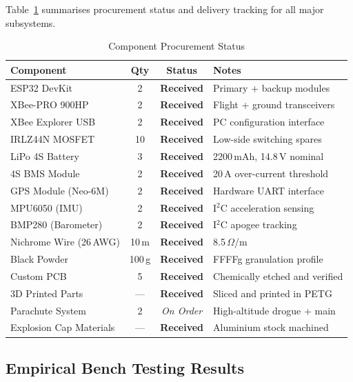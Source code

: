 Table~\ref{tab:procurement} summarises procurement status and delivery tracking
for all major subsystems.

\begin{table}[!htbp]
  \centering
  \caption{Component Procurement Status}
  \label{tab:procurement}
  \small
  \renewcommand{\arraystretch}{1.15}
  \begin{tabular}{@{}l|c|c|l@{}}
    \toprule
    \rowcolor{gray!22}\textbf{Component} & \textbf{Qty} & \textbf{Status} & \textbf{Notes} \\ \midrule
    ESP32 DevKit & 2 & \textbf{Received} & Primary + backup modules \\
    XBee-PRO 900HP & 2 & \textbf{Received} & Flight + ground transceivers \\
    XBee Explorer USB & 2 & \textbf{Received} & PC configuration interface \\
    IRLZ44N MOSFET & 10 & \textbf{Received} & Low-side switching spares \\
    LiPo 4S Battery & 3 & \textbf{Received} & 2200\,mAh, 14.8\,V nominal \\
    4S BMS Module & 2 & \textbf{Received} & 20\,A over-current threshold \\
    GPS Module (Neo-6M) & 2 & \textbf{Received} & Hardware UART interface \\
    MPU6050 (IMU) & 2 & \textbf{Received} & I$^2$C acceleration sensing \\
    BMP280 (Barometer) & 2 & \textbf{Received} & I$^2$C apogee tracking \\
    Nichrome Wire (26\,AWG) & 10\,m & \textbf{Received} & 8.5\,$\Omega$/m \\
    Black Powder & 100\,g & \textbf{Received} & FFFFg granulation profile \\
    Custom PCB & 5 & \textbf{Received} & Chemically etched and verified \\
    3D Printed Parts & --- & \textbf{Received} & Sliced and printed in PETG \\
    Parachute System & 2 & \textit{On Order} & High-altitude drogue + main \\
    Explosion Cap Materials & --- & \textbf{Received} & Aluminium stock machined \\ \bottomrule
  \end{tabular}
\end{table}

\subsection{Empirical Bench Testing Results}

